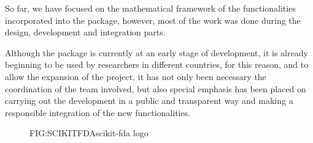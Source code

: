 So far, we have focused on the mathematical framework of the functionalities
incorporated into the package, however, most of the work was done during the
design, development and integration parts.

Although the package is currently at an early stage of development, it is
already beginning to be used by researchers in different countries, for this
reason, and to allow the expansion of the project, it has not only been
necessary the coordination of the team involved, but also special emphasis has
been placed on carrying out the development in a public and transparent way
and making a responsible integration of the new functionalities.

\begin{figure}[scikit-fda logo]{FIG:SCIKITFDA}{scikit-fda logo}
	
\end{figure}